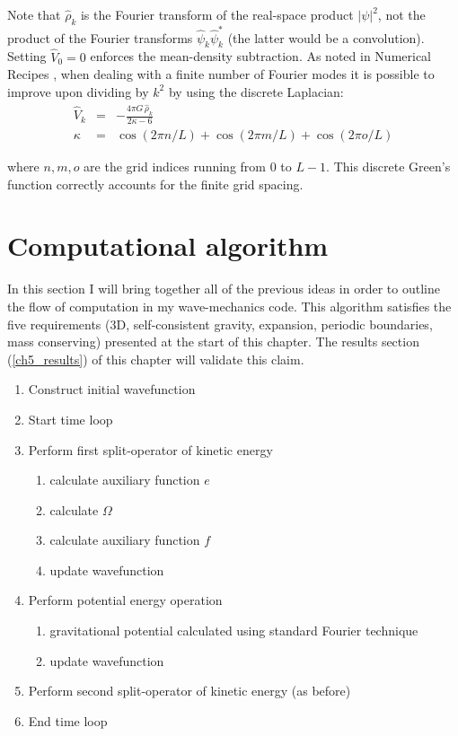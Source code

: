 \noindent Note that $\hat{\rho}_k$ is the Fourier transform of the real-space product $|\psi|^2$, not the product of the Fourier transforms $\hat{\psi}_k \hat{\psi}_k^*$ (the latter would be a convolution). Setting $\hat{V}_0 = 0$ enforces the mean-density subtraction. As noted in Numerical Recipes \citep{bib_nr}, when dealing with a finite number of Fourier modes it is possible to improve upon dividing by $k^2$ by using the discrete Laplacian:
\begin{eqnarray}
 \hat{V}_k &=& -\frac{4\pi G\, \hat{\rho}_k}{ 2 \kappa - 6} \nonumber\\
 \kappa &=& \cos(2 \pi n/L) + \cos(2 \pi m/L) + \cos(2 \pi o/L)
\end{eqnarray}

\noindent where $n,m,o$ are the grid indices running from 0 to $L-1$. This discrete Green's function correctly accounts for the finite grid spacing.

\section{Computational algorithm}
In this section I will bring together all of the previous ideas in order to outline the flow of computation in my wave-mechanics code.
This algorithm satisfies the five requirements (3D, self-consistent gravity, expansion, periodic boundaries, mass conserving) presented at the start of this chapter. The results section (\ref{ch5_results}) of this chapter will validate this claim.

\begin{enumerate}
\item Construct initial wavefunction
\item Start time loop
\item Perform first split-operator of kinetic energy
\begin{enumerate}
\item calculate auxiliary function $e$
\item calculate $\Omega$
\item calculate auxiliary function $f$
\item update wavefunction
\end{enumerate}
\item Perform potential energy operation
\begin{enumerate}
\item gravitational potential calculated using standard Fourier technique
\item update wavefunction
\end{enumerate}
\item Perform second split-operator of kinetic energy (as before)
\item End time loop
\end{enumerate}


